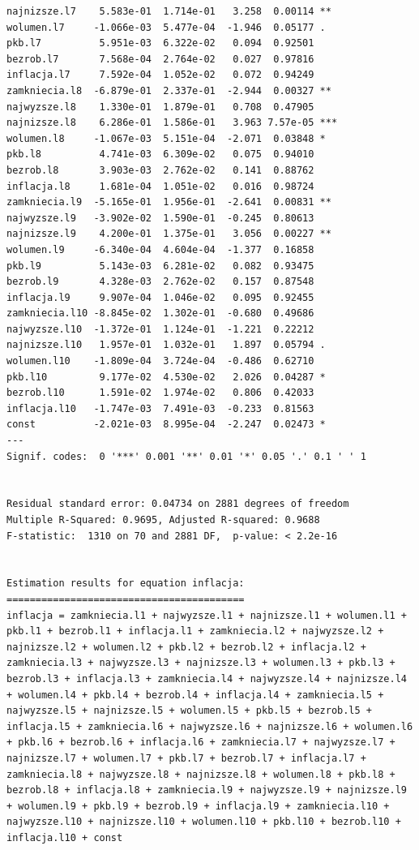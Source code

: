 \documentclass[
  polish,
  letterpaper,
  DIV=11,
  numbers=noendperiod]{scrartcl}
\begin{document}
\begin{verbatim}
najnizsze.l7    5.583e-01  1.714e-01   3.258  0.00114 ** 
wolumen.l7     -1.066e-03  5.477e-04  -1.946  0.05177 .  
pkb.l7          5.951e-03  6.322e-02   0.094  0.92501    
bezrob.l7       7.568e-04  2.764e-02   0.027  0.97816    
inflacja.l7     7.592e-04  1.052e-02   0.072  0.94249    
zamkniecia.l8  -6.879e-01  2.337e-01  -2.944  0.00327 ** 
najwyzsze.l8    1.330e-01  1.879e-01   0.708  0.47905    
najnizsze.l8    6.286e-01  1.586e-01   3.963 7.57e-05 ***
wolumen.l8     -1.067e-03  5.151e-04  -2.071  0.03848 *  
pkb.l8          4.741e-03  6.309e-02   0.075  0.94010    
bezrob.l8       3.903e-03  2.762e-02   0.141  0.88762    
inflacja.l8     1.681e-04  1.051e-02   0.016  0.98724    
zamkniecia.l9  -5.165e-01  1.956e-01  -2.641  0.00831 ** 
najwyzsze.l9   -3.902e-02  1.590e-01  -0.245  0.80613    
najnizsze.l9    4.200e-01  1.375e-01   3.056  0.00227 ** 
wolumen.l9     -6.340e-04  4.604e-04  -1.377  0.16858    
pkb.l9          5.143e-03  6.281e-02   0.082  0.93475    
bezrob.l9       4.328e-03  2.762e-02   0.157  0.87548    
inflacja.l9     9.907e-04  1.046e-02   0.095  0.92455    
zamkniecia.l10 -8.845e-02  1.302e-01  -0.680  0.49686    
najwyzsze.l10  -1.372e-01  1.124e-01  -1.221  0.22212    
najnizsze.l10   1.957e-01  1.032e-01   1.897  0.05794 .  
wolumen.l10    -1.809e-04  3.724e-04  -0.486  0.62710    
pkb.l10         9.177e-02  4.530e-02   2.026  0.04287 *  
bezrob.l10      1.591e-02  1.974e-02   0.806  0.42033    
inflacja.l10   -1.747e-03  7.491e-03  -0.233  0.81563    
const          -2.021e-03  8.995e-04  -2.247  0.02473 *  
---
Signif. codes:  0 '***' 0.001 '**' 0.01 '*' 0.05 '.' 0.1 ' ' 1


Residual standard error: 0.04734 on 2881 degrees of freedom
Multiple R-Squared: 0.9695, Adjusted R-squared: 0.9688 
F-statistic:  1310 on 70 and 2881 DF,  p-value: < 2.2e-16 


Estimation results for equation inflacja: 
========================================= 
inflacja = zamkniecia.l1 + najwyzsze.l1 + najnizsze.l1 + wolumen.l1 + pkb.l1 + bezrob.l1 + inflacja.l1 + zamkniecia.l2 + najwyzsze.l2 + najnizsze.l2 + wolumen.l2 + pkb.l2 + bezrob.l2 + inflacja.l2 + zamkniecia.l3 + najwyzsze.l3 + najnizsze.l3 + wolumen.l3 + pkb.l3 + bezrob.l3 + inflacja.l3 + zamkniecia.l4 + najwyzsze.l4 + najnizsze.l4 + wolumen.l4 + pkb.l4 + bezrob.l4 + inflacja.l4 + zamkniecia.l5 + najwyzsze.l5 + najnizsze.l5 + wolumen.l5 + pkb.l5 + bezrob.l5 + inflacja.l5 + zamkniecia.l6 + najwyzsze.l6 + najnizsze.l6 + wolumen.l6 + pkb.l6 + bezrob.l6 + inflacja.l6 + zamkniecia.l7 + najwyzsze.l7 + najnizsze.l7 + wolumen.l7 + pkb.l7 + bezrob.l7 + inflacja.l7 + zamkniecia.l8 + najwyzsze.l8 + najnizsze.l8 + wolumen.l8 + pkb.l8 + bezrob.l8 + inflacja.l8 + zamkniecia.l9 + najwyzsze.l9 + najnizsze.l9 + wolumen.l9 + pkb.l9 + bezrob.l9 + inflacja.l9 + zamkniecia.l10 + najwyzsze.l10 + najnizsze.l10 + wolumen.l10 + pkb.l10 + bezrob.l10 + inflacja.l10 + const 


\end{verbatim}
\end{document}
